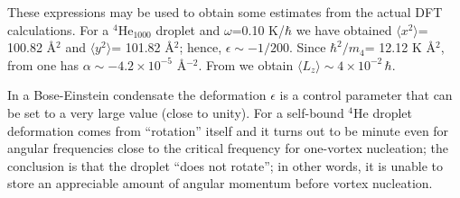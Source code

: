  These expressions may be used to obtain some estimates from the actual DFT calculations.
 For  a $^4$He$_{1000}$ droplet and $\omega$=0.10 K/$\hbar$ 
 we have obtained $\langle x^2\rangle$= 100.82 \AA$^2$ and  $\langle y^2\rangle$= 101.82 \AA$^2$; hence,
 $\epsilon \sim -1/200$. Since $\hbar^2/m_4$= 12.12 K \AA$^2$, from  one has $\alpha \sim -4.2 \times 10^{-5}$ \AA$^{-2}$. 
From  we obtain  $\langle L_z\rangle \sim 4 \times 10^{-2} \, \hbar$.
  
 In a Bose-Einstein condensate  the deformation $\epsilon$ is a control parameter that can be set to a very large value (close to unity). For a self-bound $^4$He droplet deformation comes from
 ``rotation'' itself and it turns out to be minute
  even for angular frequencies close to the critical frequency  for one-vortex nucleation; the conclusion is that the droplet ``does not rotate'';
 in other words, it is unable to store an appreciable amount of angular momentum before vortex  nucleation.

